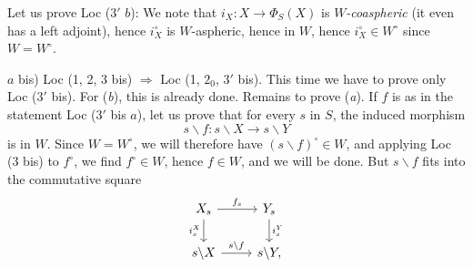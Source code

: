 Let us prove Loc ($3'$ $b$): We note that $i_X : X \longrightarrow \Phi_S(X)$ is $W$\textit{-coaspheric} (it even has a left adjoint), hence $i_X^\circ$ is $W$-aspheric, hence in $W$, hence $i_X^\circ \in W^\circ$ since $W = W^\circ$. %

$a$ bis) Loc (1, 2, 3 bis) $\Longrightarrow$ Loc (1, $2_0$, $3'$ bis). This time we have to prove only Loc ($3'$ bis). For (\textit{b}), this is already done. Remains to prove (\textit{a}). If $f$ is as in the statement Loc ($3'$ bis $a$), let us prove that for every $s$ in $S$, the induced morphism
\[
s\backslash f : s\backslash X \longrightarrow s\backslash Y
\]
is in $W$. Since $W = W^\circ$, we will therefore have $(s\backslash f)^\circ \in W$, and applying Loc (3 bis) to $f^\circ$, we find $f^\circ \in W$, hence $f \in W$, and we will be done. But $s\backslash f$ fits into the commutative square
\[
\begin{tikzcd}
X_s \arrow[r, "f_s"] \arrow[d, "i_s^X"'] & Y_s \arrow[d, "i_s^Y"] \\
s\backslash X \arrow[r, "s\backslash f"] & s\backslash Y,
\end{tikzcd}
\]